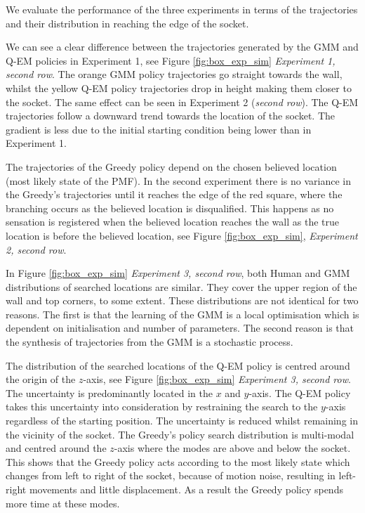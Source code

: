 We evaluate the performance of the three experiments in terms of the trajectories and their distribution in reaching 
the edge of the socket. 

We can see a clear difference between the trajectories generated by the GMM and Q-EM policies in Experiment 1, 
see Figure \ref{fig:box_exp_sim} \textit{Experiment 1, second row}. The orange GMM policy trajectories 
go straight towards the wall, whilst the yellow Q-EM policy trajectories drop in height making them closer 
to the socket. The same effect can be seen in Experiment 2 (\textit{second row}). The Q-EM trajectories 
follow a downward trend towards the location of the socket. The gradient is less due to the initial starting condition being lower than in Experiment 1. 

The trajectories of the Greedy policy depend on the chosen believed location (most likely state of the PMF). In the 
second experiment there is no variance in the Greedy's trajectories until it reaches the edge of the red square, 
where the branching occurs as the believed location is disqualified. This happens as  
no sensation is registered when the believed location reaches the wall as the true location is before the believed location, see 
Figure \ref{fig:box_exp_sim}, \textit{Experiment 2, second row}.

In Figure \ref{fig:box_exp_sim} \textit{Experiment 3, second row}, both Human and GMM distributions of
searched locations are similar. They cover the upper region of the wall and top corners, to 
some extent. These distributions are not identical for two reasons. The first is that the learning of the GMM is a 
local optimisation which is dependent on initialisation and number of parameters. The second reason is that 
the synthesis of trajectories from the GMM is a stochastic process. 

The distribution of the searched locations of the Q-EM policy is centred around the origin of the $z$-axis,
see Figure \ref{fig:box_exp_sim}  \textit{Experiment 3, second row}. 
The uncertainty is predominantly located in the $x$ and $y$-axis. The Q-EM policy takes this uncertainty 
into consideration by restraining the search to the $y$-axis regardless of the starting position. The uncertainty 
is reduced whilst remaining in the vicinity of the socket. 
The Greedy's policy search distribution is multi-modal and centred around the $z$-axis where the modes are above 
and below the socket. This shows that the Greedy policy acts according to the most likely state 
which changes from left to right of the socket, because of motion noise, resulting in left-right 
movements and little displacement. As a result the Greedy policy spends more time at these modes.

